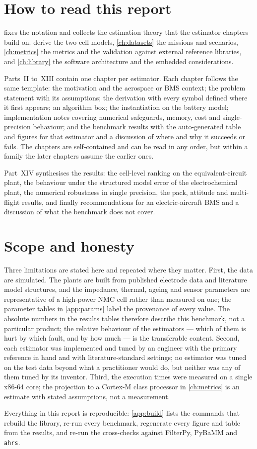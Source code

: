\section{How to read this report}

 fixes the notation and collects the estimation theory that the estimator
chapters build on.  derive the two cell models, \cref{ch:datasets} the
missions and scenarios, \cref{ch:metrics} the metrics and the validation against external
reference libraries, and \cref{ch:library} the software architecture and the embedded
considerations.

Parts~II to~XIII contain one chapter per estimator. Each chapter follows the same template:
the motivation and the aerospace or BMS context; the problem statement with its assumptions;
the derivation with every symbol defined where it first appears; an algorithm box; the
instantiation on the battery model; implementation notes covering numerical safeguards,
memory, cost and single-precision behaviour; and the benchmark results with the
auto-generated table and figures for that estimator and a discussion of where and why it
succeeds or fails. The chapters are self-contained and can be read in any order, but within
a family the later chapters assume the earlier ones.

Part~XIV synthesises the results: the cell-level ranking on the equivalent-circuit plant,
the behaviour under the structured model error of the electrochemical plant, the numerical
robustness in single precision, the pack, attitude and multi-flight results, and finally
recommendations for an electric-aircraft BMS and a discussion of what the benchmark does not
cover.

\section{Scope and honesty}

Three limitations are stated here and repeated where they matter. First, the data are
simulated. The plants are built from published electrode data and literature model
structures, and the impedance, thermal, ageing and sensor parameters are representative of
a high-power NMC cell rather than measured on one; the parameter tables in \cref{app:params}
label the provenance of every value. The absolute numbers in the results tables therefore
describe this benchmark, not a particular product; the relative behaviour of the estimators
--- which of them is hurt by which fault, and by how much --- is the transferable content.
Second, each estimator was implemented and tuned by an engineer with the primary reference
in hand and with literature-standard settings; no estimator was tuned on the test data
beyond what a practitioner would do, but neither was any of them tuned by its inventor.
Third, the execution times were measured on a single x86-64 core; the projection to a
Cortex-M class processor in \cref{ch:metrics} is an estimate with stated assumptions, not a
measurement.

Everything in this report is reproducible: \cref{app:build} lists the commands that rebuild
the library, re-run every benchmark, regenerate every figure and table from the results, and
re-run the cross-checks against FilterPy, PyBaMM and \texttt{ahrs}.
